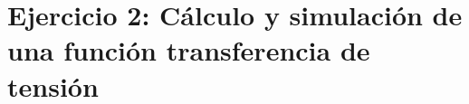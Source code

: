 \section*{\color{olive}Ejercicio 2: C\'alculo y simulaci\'on de una funci\'on transferencia de tensi\'on}